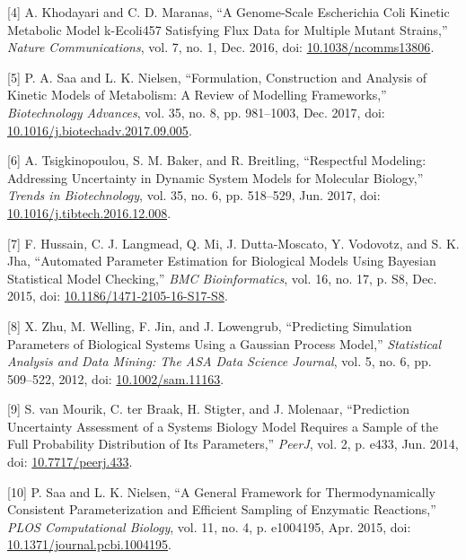 \documentclass[11pt]{article}
\begin{document}
\hypertarget{citeproc_bib_item_4}{[4] A. Khodayari and C. D. Maranas, “A Genome-Scale Escherichia Coli Kinetic Metabolic Model k-Ecoli457 Satisfying Flux Data for Multiple Mutant Strains,” \textit{Nature Communications}, vol. 7, no. 1, Dec. 2016, doi: \href{https://doi.org/10.1038/ncomms13806}{10.1038/ncomms13806}.}

\hypertarget{citeproc_bib_item_5}{[5] P. A. Saa and L. K. Nielsen, “Formulation, Construction and Analysis of Kinetic Models of Metabolism: A Review of Modelling Frameworks,” \textit{Biotechnology Advances}, vol. 35, no. 8, pp. 981–1003, Dec. 2017, doi: \href{https://doi.org/10.1016/j.biotechadv.2017.09.005}{10.1016/j.biotechadv.2017.09.005}.}

\hypertarget{citeproc_bib_item_6}{[6] A. Tsigkinopoulou, S. M. Baker, and R. Breitling, “Respectful Modeling: Addressing Uncertainty in Dynamic System Models for Molecular Biology,” \textit{Trends in Biotechnology}, vol. 35, no. 6, pp. 518–529, Jun. 2017, doi: \href{https://doi.org/10.1016/j.tibtech.2016.12.008}{10.1016/j.tibtech.2016.12.008}.}

\hypertarget{citeproc_bib_item_7}{[7] F. Hussain, C. J. Langmead, Q. Mi, J. Dutta-Moscato, Y. Vodovotz, and S. K. Jha, “Automated Parameter Estimation for Biological Models Using Bayesian Statistical Model Checking,” \textit{BMC Bioinformatics}, vol. 16, no. 17, p. S8, Dec. 2015, doi: \href{https://doi.org/10.1186/1471-2105-16-S17-S8}{10.1186/1471-2105-16-S17-S8}.}

\hypertarget{citeproc_bib_item_8}{[8] X. Zhu, M. Welling, F. Jin, and J. Lowengrub, “Predicting Simulation Parameters of Biological Systems Using a Gaussian Process Model,” \textit{Statistical Analysis and Data Mining: The ASA Data Science Journal}, vol. 5, no. 6, pp. 509–522, 2012, doi: \href{https://doi.org/10.1002/sam.11163}{10.1002/sam.11163}.}

\hypertarget{citeproc_bib_item_9}{[9] S. van Mourik, C. ter Braak, H. Stigter, and J. Molenaar, “Prediction Uncertainty Assessment of a Systems Biology Model Requires a Sample of the Full Probability Distribution of Its Parameters,” \textit{PeerJ}, vol. 2, p. e433, Jun. 2014, doi: \href{https://doi.org/10.7717/peerj.433}{10.7717/peerj.433}.}

\hypertarget{citeproc_bib_item_10}{[10] P. Saa and L. K. Nielsen, “A General Framework for Thermodynamically Consistent Parameterization and Efficient Sampling of Enzymatic Reactions,” \textit{PLOS Computational Biology}, vol. 11, no. 4, p. e1004195, Apr. 2015, doi: \href{https://doi.org/10.1371/journal.pcbi.1004195}{10.1371/journal.pcbi.1004195}.}
\end{document}
